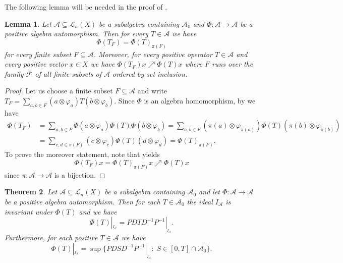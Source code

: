 \documentclass[12pt,reqno]{amsart}
\theoremstyle{plain}
\newtheorem{theorem}{Theorem}[section]
\newtheorem{lemma}[theorem]{Lemma}
\theoremstyle{definition}
\begin{document}
The following lemma will be needed in the proof of .
 
\begin{lemma}\label{pointwise_suprema}
Let  $\mathscr A\subseteq \mathscr L_n(X)$ be a subalgebra containing $\mathscr A_0$ and $\Phi\colon \mathscr A\to \mathscr A$ be a positive algebra automorphism. Then for every $T\in \mathscr A$ we have
$$\Phi(T_F)=\Phi(T)_{\pi(F)}$$
for every finite subset $F\subseteq \mathcal A$. Moreover, for every positive operator $T\in \mathscr A$ and every positive vector $x\in X$  we have 
$\Phi(T_F)x\nearrow \Phi(T)x$ where $F$ runs over the family $\mathcal F$ of all finite subsets of $\mathcal A$ ordered by set inclusion. 
\end{lemma}

\begin{proof}
Let us choose a finite subset $F\subseteq \mathcal A$ and write
$T_F=\sum_{a,b\in F}(a\otimes \varphi_a)T(b\otimes \varphi_b)$. Since $\Phi$ is an algebra homomorphism, by  we have
\begin{align*}
\Phi(T_F) &= \sum_{a,b\in F} \Phi(a\otimes \varphi_a)\Phi(T)\Phi(b\otimes \varphi_b)
= \sum_{a,b\in F} (\pi(a)\otimes \varphi_{\pi(a)}) \Phi(T) (\pi(b)\otimes \varphi_{\pi(b)}) \\
&= \sum_{c,d \in \pi(F)}(c\otimes \varphi_c)\Phi(T)(d\otimes \varphi_d)= \Phi(T)_{\pi(F)}.
\end{align*}
To prove the moreover statement, note that  yields 
$$\Phi(T_F)x=\Phi(T)_{\pi(F)}x\nearrow \Phi(T)x$$ since $\pi\colon \mathcal A\to \mathcal A$ is a bijection. 
\end{proof}

\begin{theorem}\label{reprezentacija avtomorfizma}
Let $\mathscr A\subseteq \mathscr L_n(X)$ be a subalgebra containing $\mathscr A_0$ and let $\Phi\colon \mathscr A\to \mathscr A$ be a positive algebra automorphism. Then for each $T\in \mathscr A_0$ the ideal $I_{\mathcal A}$ is invariant under $\Phi(T)$ and we have
$$\Phi(T)|_{_{I_{\mathcal A}}}=PDTD^{-1}P^{-1}|_{_{I_{\mathcal A}}}.$$ 
Furthermore, for each positive $T\in \mathscr A$ we have
$$\Phi(T)|_{_{I_{\mathcal A}}}=\sup \{PDSD^{-1}P^{-1}|_{_{I_{\mathcal A}}}:\; S\in [0,T]\cap \mathscr A_0\}.$$
\end{theorem}
\end{document}
